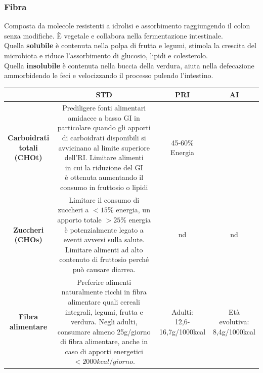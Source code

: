 \documentclass[10pt]{article}
\begin{document}
\subsubsection{Fibra} 
Composta da molecole resistenti a idrolisi e assorbimento raggiungendo il colon senza modifiche. È vegetale e collabora nella fermentazione intestinale.\\
Quella \textbf{solubile} è contenuta nella polpa di frutta e legumi, stimola la crescita del microbiota e riduce l'assorbimento di glucosio, lipidi e colesterolo.\\
Quella \textbf{insolubile} è contenuta nella buccia della verdura, aiuta nella defecazione ammorbidendo le feci e velocizzando il processo pulendo l'intestino. 
\begin{center}
\begin{tabular}{|c|c|c|c|}
\hline
&\textbf{STD}&\textbf{PRI} & \textbf{AI}\\\hline
\makecell{\textbf{Carboidrati}\\\textbf{totali} \\\textbf{(CHOt)}} & \makecell{Prediligere fonti alimentari\\ amidacee a basso GI in\\ particolare quando gli apporti \\di carboidrati disponibili si\\ avvicinano al limite superiore \\dell'RI. Limitare alimenti\\ in cui la riduzione del GI\\ è ottenuta aumentando il\\ consumo in fruttosio o lipidi}& 45-60\% Energia & \\\hline
\makecell{\textbf{Zuccheri}\\\textbf{(CHOs)}} & \makecell{Limitare il consumo di\\ zuccheri a $<15\%$ energia, un \\apporto totale $>25\%$ energia è\\ potenzialmente legato a eventi \\avversi sulla salute. Limitare\\ alimenti ad alto contenuto di\\ fruttosio perché può \\causare diarrea.} & nd & nd\\\hline
\makecell{\textbf{Fibra}\\\textbf{alimentare}} & \makecell{Preferire alimenti naturalmente\\ ricchi in fibra alimentare quali \\cereali integrali, legumi, frutta\\ e verdura. Negli adulti,\\ consumare almeno 25g/giorno\\ di fibra alimentare, anche in\\ caso di apporti energetici\\ $<2000kcal/giorno$.} & \makecell{Adulti:\\12,6-16,7g/1000kcal} & \makecell{Età evolutiva:\\8,4g/1000kcal}\\\hline
\end{tabular}
\end{center}
\end{document}
